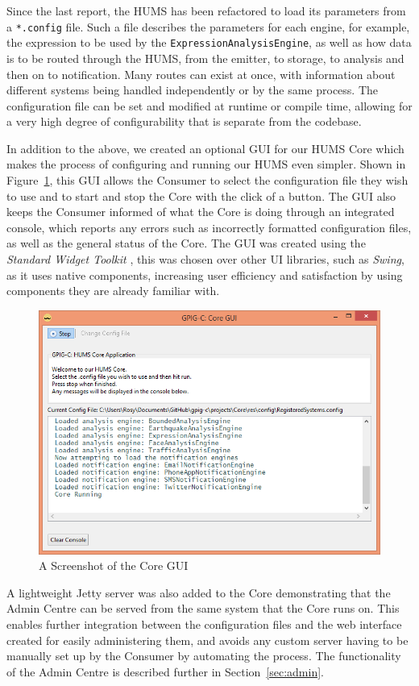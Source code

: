 \documentclass[10pt,a4paper]{article}
\begin{document}
Since the last report, the HUMS has been refactored to load its parameters from a \texttt{*.config} file. Such a file describes the parameters for each engine, for example, the expression to be used by the \texttt{ExpressionAnalysisEngine}, as well as how data is to be routed through the HUMS, from the emitter, to storage, to analysis and then on to notification. Many routes can exist at once, with information about different systems being handled independently or by the same process. The configuration file can be set and modified at runtime or compile time, allowing for a very high degree of configurability that is separate from the codebase.

In addition to the above, we created an optional GUI for our HUMS Core which makes the process of configuring and running our HUMS even simpler. Shown in Figure~\ref{fig:coreGUI}, this GUI allows the Consumer to select the configuration file they wish to use and to start and stop the Core with the click of a button. The GUI also keeps the Consumer informed of what the Core is doing through an integrated console, which reports any errors such as incorrectly formatted configuration files, as well as the general status of the Core. The GUI was created using the \emph{Standard Widget Toolkit} \cite{swt}, this was chosen over other UI libraries, such as \emph{Swing}, as it uses native components, increasing user efficiency and satisfaction by using components they are already familiar with.

\begin{figure}[tb]
\centering
\includegraphics[width = \textwidth]{images/coreGUI.png}
\caption{A Screenshot of the Core GUI}
\label{fig:coreGUI}
\end{figure}
A lightweight Jetty server was also added to the Core demonstrating that the Admin Centre can be served from the same system that the Core runs on. This enables further integration between the configuration files and the web interface created for easily administering them, and avoids any custom server having to be manually set up by the Consumer by automating the process. The functionality of the Admin Centre is described further in Section~\ref{sec:admin}. 
\end{document}
